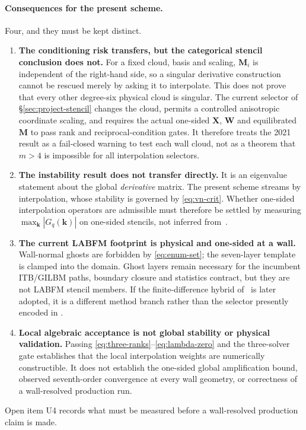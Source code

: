 \documentclass[11pt,a4paper]{article}
\begin{document}
\paragraph{Consequences for the present scheme.} Four, and they must be kept distinct.
\begin{enumerate}[label=(\roman*)]
\item \textbf{The conditioning risk transfers, but the categorical stencil conclusion
does not.} For a fixed cloud, basis and scaling, $\bm M_i$ is independent of the
right-hand side, so a singular derivative construction cannot be rescued merely by
asking it to interpolate. This does not prove that every other degree-six physical
cloud is singular. The current selector of \S\ref{sec:project-stencil} changes the cloud,
permits a controlled anisotropic coordinate scaling, and requires the actual one-sided
$\bm X$, $\bm W$ and equilibrated $\bm M$ to pass rank and reciprocal-condition gates.
It therefore treats the 2021 result as a fail-closed warning to test each wall cloud,
not as a theorem that $m>4$ is impossible for all interpolation selectors.
\item \textbf{The instability result does not transfer directly.} It is an eigenvalue
statement about the global \emph{derivative} matrix. The present scheme streams by
interpolation, whose stability is governed by \eqref{eq:vn-crit}. Whether one-sided
interpolation operators are admissible must therefore be settled by measuring
$\max_{\bm k}|G_q(\bm k)|$ on one-sided stencils, not inferred from~\cite{KL2021}.
\item \textbf{The current LABFM footprint is physical and one-sided at a wall.}
Wall-normal ghosts are forbidden by \eqref{eq:enum-set}; the seven-layer template is
clamped into the domain. Ghost layers remain necessary for the incumbent ITB/GILBM
paths, boundary closure and statistics contract, but they are not LABFM stencil members.
If the finite-difference hybrid of~\cite{KL2021} is later adopted, it is a different
method branch rather than the selector presently encoded in
.
\item \textbf{Local algebraic acceptance is not global stability or physical
validation.} Passing \eqref{eq:three-ranks}--\eqref{eq:lambda-zero} and the three-solver
gate establishes that the local interpolation weights are numerically constructible.
It does not establish the one-sided global amplification bound, observed seventh-order
convergence at every wall geometry, or correctness of a wall-resolved production run.
\end{enumerate}
Open item U4 records what must be measured before a wall-resolved production claim is
made.
\end{document}
